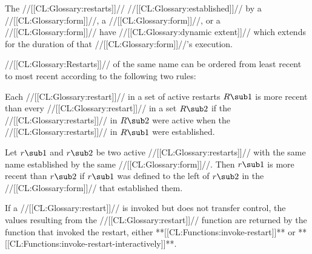 The //[[CL:Glossary:restarts]]// //[[CL:Glossary:established]]// by 
    a  //[[CL:Glossary:form]]//, 
    a  //[[CL:Glossary:form]]//,
 or a  //[[CL:Glossary:form]]//
have //[[CL:Glossary:dynamic extent]]//
which extends for the duration of that //[[CL:Glossary:form]]//'s execution.



//[[CL:Glossary:Restarts]]// of the same name can be ordered from least recent to
most recent according to the following two rules:
 
\beginlist
 
  Each //[[CL:Glossary:restart]]// in a set of active restarts
$R\sub 1$ is more recent than every //[[CL:Glossary:restart]]// in a
set $R\sub 2$ if the //[[CL:Glossary:restarts]]// 
in $R\sub 2$ were active when the  //[[CL:Glossary:restarts]]// in $R\sub 1$ were
established.
 
  Let $r\sub 1$ and $r\sub 2$ be two active //[[CL:Glossary:restarts]]// with
the same name established by the same //[[CL:Glossary:form]]//. Then $r\sub 1$ is
more recent than $r\sub 2$ if $r\sub 1$ was defined to the
left of $r\sub 2$ in the //[[CL:Glossary:form]]// that established them.
 
\endlist

If a //[[CL:Glossary:restart]]// is invoked but does not transfer control,
the values resulting from the //[[CL:Glossary:restart]]// function are
returned by the function that invoked the restart, either
**[[CL:Functions:invoke-restart]]** or **[[CL:Functions:invoke-restart-interactively]]**.






































